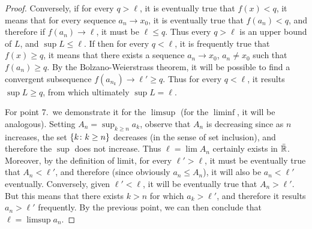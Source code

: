 \begin{proof}
  Conversely, if for every $q>\ell$, it is eventually true that $f(x)<q$,
  it means that for every sequence $a_n\to x_0$, it is eventually true that
  $f(a_n) < q$, and therefore if $f(a_n)\to \ell$,
  it must be $\ell\le q$. 
  Thus every $q>\ell$ is an upper bound of $L$, and $\sup L\le \ell$.
  If then for every $q<\ell$, it is frequently true that $f(x)\ge q$,
  it means that there exists a sequence $a_n\to x_0$, $a_n\neq x_0$ 
  such that $f(a_n)\ge q$. 
  By the Bolzano-Weierstrass theorem, it will be possible to find 
  a convergent subsequence $f(a_{n_k})\to \ell'\ge q$.
  Thus for every $q<\ell$, it results
  $\sup L \ge q$, from which ultimately $\sup L = \ell$. 

  For point 7.\ we demonstrate it for the $\limsup$ (for the $\liminf$,
  it will be analogous).
  Setting $A_n = \sup_{k\ge n} a_k$, observe that $A_n$ is decreasing
  since as $n$ increases, the set
  ${\left\{ k\colon k \ge n \right\}}$ decreases (in the sense of set inclusion),
  and therefore
  the $\sup$ does not increase.
  Thus $\ell=\lim A_n$ certainly exists in $\bar {{\mathbb R}}$.
  Moreover, by the definition of limit, for every $\ell'>\ell$,
  it must be eventually true that
  $A_n < \ell'$, and therefore
  (since obviously $a_n \le A_n$), it will also be
  $a_n < \ell'$ eventually.
  Conversely, given $\ell'<\ell$, it will be eventually true that
  $A_n > \ell'$. But this means that there exists $k>n$
  for which $a_k > \ell'$, and therefore
  it results $a_n > \ell'$ frequently.
  By the previous point, we can then conclude that
  $\ell = \limsup a_n$.
\end{proof}

